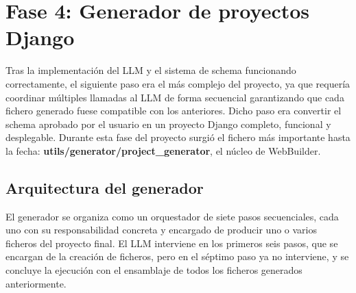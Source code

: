 \section{Fase 4: Generador de proyectos Django}
\label{sec:generador-proytectos}

Tras la implementación del LLM y el sistema de schema funcionando correctamente, el siguiente paso era el más complejo del proyecto, ya que requería 
coordinar múltiples llamadas al LLM de forma secuencial garantizando 
que cada fichero generado fuese compatible con los anteriores. Dicho paso era convertir el schema aprobado por el usuario en un proyecto Django completo, funcional y desplegable. Durante esta fase del proyecto surgió el fichero más importante hasta la fecha: \textbf{utils/generator/project\_generator}, el núcleo de WebBuilder.


\subsection{Arquitectura del generador}
\label{subsec:arquitectura-generador}

El generador se organiza como un orquestador de siete pasos secuenciales, cada uno con su responsabilidad concreta y encargado de producir uno o varios ficheros del proyecto final.
El LLM interviene en los primeros seis pasos, que se encargan de la creación de ficheros, pero en el séptimo paso ya no interviene, y se concluye la ejecución con el ensamblaje de todos los ficheros generados anteriormente.

